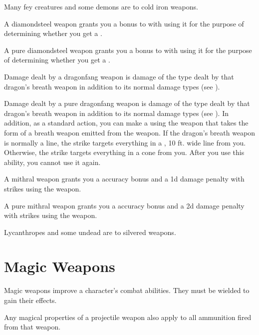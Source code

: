          Many fey creatures and some demons are  to cold iron weapons.

         A diamondsteel weapon grants you a  bonus to  with  using it for the purpose of determining whether you get a .

         A pure diamondsteel weapon grants you a  bonus to  with  using it for the purpose of determining whether you get a .

         Damage dealt by a dragonfang weapon is damage of the type dealt by that dragon's breath weapon in addition to its normal damage types (see ).

         Damage dealt by a pure dragonfang weapon is damage of the type dealt by that dragon's breath weapon in addition to its normal damage types (see ).
        In addition, as a standard action, you can make a  using the weapon that takes the form of a breath weapon emitted from the weapon.
        If the dragon's breath weapon is normally a line, the strike targets everything in a \arealarge, 10 ft. wide line from you.
        Otherwise, the strike targets everything in a \areamed cone from you.
        After you use this ability, you  cannot use it again.

         A mithral weapon grants you a  accuracy bonus and a \minus1d damage penalty with strikes using the weapon.

         A pure mithral weapon grants you a  accuracy bonus and a \minus2d damage penalty with strikes using the weapon.

         Lycanthropes and some undead are  to silvered weapons.

\newpage
\section{Magic Weapons}
    Magic weapons improve a character's combat abilities.
    They must be wielded to gain their effects.

     Any magical properties of a projectile weapon also apply to all ammunition fired from that weapon.

